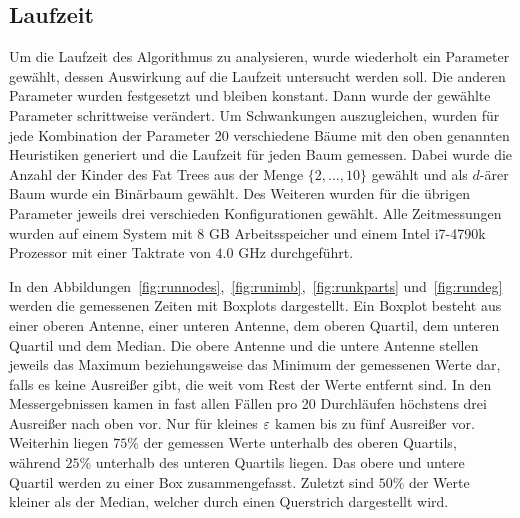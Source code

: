 \subsection{Laufzeit}\label{sec:exprun}
Um die Laufzeit des Algorithmus zu analysieren, wurde wiederholt ein Parameter gewählt, dessen Auswirkung auf die Laufzeit untersucht werden soll.
Die anderen Parameter wurden festgesetzt und bleiben konstant.
Dann wurde der gewählte Parameter schrittweise verändert.
Um Schwankungen auszugleichen, wurden für jede Kombination der Parameter 20 verschiedene Bäume mit den oben genannten Heuristiken generiert und die Laufzeit für jeden Baum gemessen.
Dabei wurde die Anzahl der Kinder des Fat Trees aus der Menge $\{2, \ldots, 10\}$ gewählt und als $d$\hyp ärer Baum wurde ein Binärbaum gewählt.
Des Weiteren wurden für die übrigen Parameter jeweils drei verschieden Konfigurationen gewählt.
Alle Zeitmessungen wurden auf einem System mit $8$ GB Arbeitsspeicher und einem Intel i7-4790k Prozessor mit einer Taktrate von $4.0$ GHz durchgeführt.

In den Abbildungen~\ref{fig:runnodes},~\ref{fig:runimb},~\ref{fig:runkparts} und~\ref{fig:rundeg} werden die gemessenen Zeiten mit Boxplots dargestellt.
Ein Boxplot besteht aus einer oberen Antenne, einer unteren Antenne, dem oberen Quartil, dem unteren Quartil und dem Median.
 Die obere Antenne und die untere Antenne stellen jeweils das Maximum beziehungsweise das Minimum der gemessenen Werte dar, falls es keine Ausreißer gibt, die weit vom Rest der Werte entfernt sind.
In den Messergebnissen kamen in fast allen Fällen pro 20 Durchläufen höchstens drei Ausreißer nach oben vor.
Nur für kleines $\varepsilon$ kamen bis zu fünf Ausreißer vor.
Weiterhin liegen $75\%$ der gemessen Werte unterhalb des oberen Quartils, während $25\%$ unterhalb des unteren Quartils liegen.
Das obere und untere Quartil werden zu einer Box zusammengefasst.
Zuletzt sind $50\%$ der Werte kleiner als der Median, welcher durch einen Querstrich dargestellt wird.


